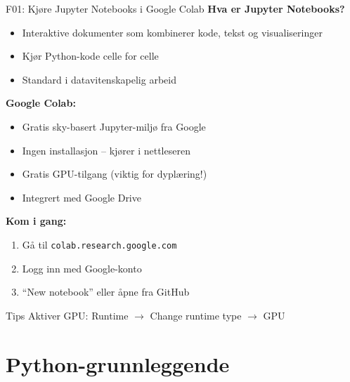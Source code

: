 \documentclass[aspectratio=169, 10pt]{beamer}
\begin{document}
\begin{frame}{F01: Kjøre Jupyter Notebooks i Google Colab}
    \textbf{Hva er Jupyter Notebooks?}
    \begin{itemize}
        \item Interaktive dokumenter som kombinerer kode, tekst og visualiseringer
        \item Kjør Python-kode celle for celle
        \item Standard i datavitenskapelig arbeid
    \end{itemize}
    
    \vspace{0.3cm}
    \textbf{Google Colab:}
    \begin{itemize}
        \item Gratis sky-basert Jupyter-miljø fra Google
        \item Ingen installasjon -- kjører i nettleseren
        \item Gratis GPU-tilgang (viktig for dyplæring!)
        \item Integrert med Google Drive
    \end{itemize}
    
    \vspace{0.3cm}
    \textbf{Kom i gang:}
    \begin{enumerate}
        \item Gå til \texttt{colab.research.google.com}
        \item Logg inn med Google-konto
        \item ``New notebook'' eller åpne fra GitHub
    \end{enumerate}
    
    \begin{block}{\footnotesize Tips}
        \footnotesize Aktiver GPU: Runtime $\rightarrow$ Change runtime type $\rightarrow$ GPU
    \end{block}
\end{frame}

\section{Python-grunnleggende}
\end{document}
